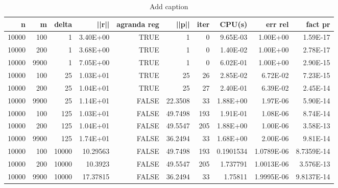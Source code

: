 \begin{table}[htbp]
  \centering
  \caption{Add caption}
    \begin{tabular}{rrrrrrrrrr}
    \toprule
    n     & m     & delta & ||r|| & agranda reg & ||p|| & iter  & CPU(s) & err rel & fact pr \\
    \midrule
    10000 & 100   & 1     & 3.40E+00 & TRUE  & 1     & 0     & 9.65E-03 & 1.00E+00 & 1.59E-17 \\
    10000 & 200   & 1     & 3.68E+00 & TRUE  & 1     & 0     & 1.40E-02 & 1.00E+00 & 2.78E-17 \\
    10000 & 9900  & 1     & 7.05E+00 & TRUE  & 1     & 0     & 6.02E-01 & 1.00E+00 & 2.90E-15 \\
    10000 & 100   & 25    & 1.03E+01 & TRUE  & 25    & 26    & 2.85E-02 & 6.72E-02 & 7.23E-15 \\
    10000 & 200   & 25    & 1.04E+01 & TRUE  & 25    & 27    & 2.40E-01 & 6.39E-02 & 2.45E-14 \\
    10000 & 9900  & 25    & 1.14E+01 & FALSE & 22.3508 & 33    & 1.88E+00 & 1.97E-06 & 5.90E-14 \\
    10000 & 100   & 125   & 1.03E+01 & FALSE & 49.7498 & 193   & 1.91E-01 & 1.08E-06 & 8.74E-14 \\
    10000 & 200   & 125   & 1.04E+01 & FALSE & 49.5547 & 205   & 1.88E+00 & 1.00E-06 & 3.58E-13 \\
    10000 & 9900  & 125   & 1.74E+01 & FALSE & 36.2494 & 33    & 1.68E+00 & 2.00E-06 & 9.81E-14 \\
    10000 & 100   & 10000 & 10.29563 & FALSE & 49.7498 & 193   & 0.1901534 & 1.0789E-06 & 8.7359E-14 \\
    10000 & 200   & 10000 & 10.3923 & FALSE & 49.5547 & 205   & 1.737791 & 1.0013E-06 & 3.576E-13 \\
    10000 & 9900  & 10000 & 17.37815 & FALSE & 36.2494 & 33    & 1.75811 & 1.9995E-06 & 9.8137E-14 \\
    \bottomrule
    \end{tabular}%
  \label{tab:addlabel}%
\end{table}%
